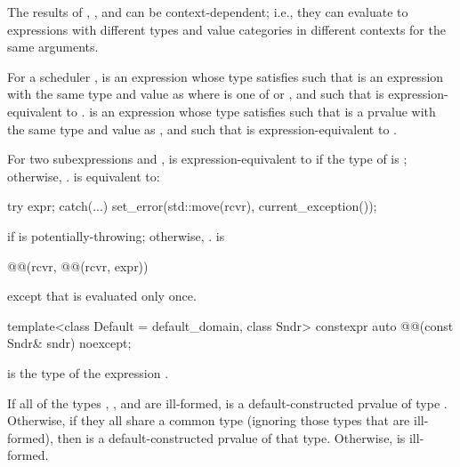 \pnum
The results of , , and 
can be context-dependent;
i.e., they can evaluate to expressions
with different types and value categories
in different contexts for the same arguments.

\pnum
For a scheduler ,
 is an expression 
whose type satisfies 
such that  is
an expression with the same type and value as 
where  is one of  or , and
such that  is expression-equivalent to
.
 is an expression 
whose type satisfies 
such that  is a prvalue
with the same type and value as , and
such that  is expression-equivalent to
.

\pnum
For two subexpressions  and ,
 is expression-equivalent to
if the type of  is ;
otherwise, .
 is equivalent to:
\begin{codeblock}
try {
  expr;
} catch(...) {
  set_error(std::move(rcvr), current_exception());
}
\end{codeblock}
if  is potentially-throwing; otherwise, .
 is
\begin{codeblock}
@@(rcvr, @@(rcvr, expr))
\end{codeblock}
except that  is evaluated only once.

\begin{itemdecl}
template<class Default = default_domain, class Sndr>
  constexpr auto @@(const Sndr& sndr) noexcept;
\end{itemdecl}

\begin{itemdescr}
\pnum
{} is the type of the expression
.

\pnum
\effects
If all of the types
,
, and\linebreak
{} are ill-formed,
 is
a default-constructed prvalue of type .
Otherwise, if they all share a common type
(ignoring those types that are ill-formed),
then  is
a default-constructed prvalue of that type.
Otherwise,  is ill-formed.
\end{itemdescr}

